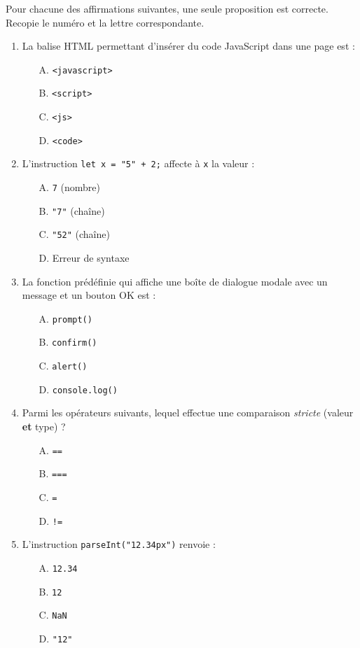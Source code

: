 \documentclass[11pt]{article}
\begin{document}
\begin{exercice}
Pour chacune des affirmations suivantes, une seule proposition est correcte. Recopie le numéro et la lettre correspondante.
\begin{enumerate}
    \item La balise HTML permettant d'insérer du code JavaScript dans une page est :
    \begin{itemize}
        \item[A.] \texttt{<javascript>} 
        \item[B.] \texttt{<script>} 
        \item[C.] \texttt{<js>} 
        \item[D.] \texttt{<code>}
    \end{itemize}
    \item L'instruction \texttt{let x = "5" + 2;} affecte à \texttt{x} la valeur :
    \begin{itemize}
        \item[A.] \texttt{7} (nombre) 
        \item[B.] \texttt{"7"} (chaîne) 
        \item[C.] \texttt{"52"} (chaîne) 
        \item[D.] Erreur de syntaxe
    \end{itemize}
    \item La fonction prédéfinie qui affiche une boîte de dialogue modale avec un message et un bouton \guillemotleft OK \guillemotright est :
    \begin{itemize}
        \item[A.] \texttt{prompt()} 
        \item[B.] \texttt{confirm()} 
        \item[C.] \texttt{alert()} 
        \item[D.] \texttt{console.log()}
    \end{itemize}
    \item Parmi les opérateurs suivants, lequel effectue une comparaison \emph{stricte} (valeur \textbf{et} type) ?
    \begin{itemize}
        \item[A.] \texttt{==} 
        \item[B.] \texttt{===} 
        \item[C.] \texttt{=} 
        \item[D.] \texttt{!=}
    \end{itemize}
    \item L'instruction \texttt{parseInt("12.34px")} renvoie :
    \begin{itemize}
        \item[A.] \texttt{12.34} 
        \item[B.] \texttt{12} 
        \item[C.] \texttt{NaN} 
        \item[D.] \texttt{"12"}
    \end{itemize}
\end{enumerate}
\end{exercice}
\end{document}
